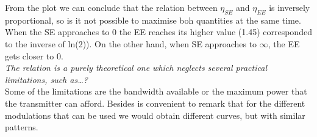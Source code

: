 From the plot we can conclude that the relation between $\eta_{SE}$ and $\eta_{EE}$ is inversely proportional, so is it not possible to maximise boh quantities at the same time. When the SE approaches to 0 the EE reaches its higher value (1.45) corresponded to the inverse of ln(2)). On the other hand, when SE approaches to $\infty$, the EE gets closer to 0.\\

\textit{The relation is a purely theoretical one which neglects several practical limitations, such as…?}\\

Some of the limitations are the bandwidth available or the maximum power that the transmitter can afford. Besides is convenient to remark that for the different modulations that can be used we would obtain different curves, but with similar patterns. 

